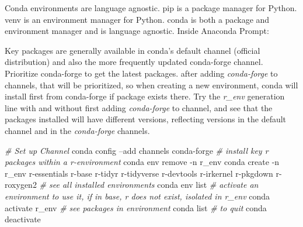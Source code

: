 \documentclass[
]{article}
\newenvironment{Shaded}{\begin{snugshade}}{\end{snugshade}}
\newcommand{\CommentTok}[1]{\textcolor[rgb]{0.56,0.35,0.01}{\textit{#1}}}
\newcommand{\ExtensionTok}[1]{#1}
\newcommand{\NormalTok}[1]{#1}
\begin{document}
Conda environments are language agnostic. pip is a package manager for
Python. venv is an environment manager for Python. conda is both a
package and environment manager and is language agnostic. Inside
Anaconda Prompt:

Key packages are generally available in conda's default channel
(official distribution) and also the more frequently updated conda-forge
channel. Prioritize conda-forge to get the latest packages. after adding
\emph{conda-forge} to channels, that will be prioritized, so when
creating a new environment, conda will install first from conda-forge if
package exists there. Try the \emph{r\_env} generation line with and
without first adding \emph{conda-forge} to channel, and see that the
packages installed will have different versions, reflecting versions in
the default channel and in the \emph{conda-forge} channels.

\begin{Shaded}
\begin{Highlighting}[]
\CommentTok{# Set up Channel}
\ExtensionTok{conda}\NormalTok{ config --add channels conda-forge}
\CommentTok{# install key r packages within a r-environment}
\ExtensionTok{conda}\NormalTok{ env remove -n r_env}
\ExtensionTok{conda}\NormalTok{ create -n r_env r-essentials r-base r-tidyr r-tidyverse r-devtools r-irkernel r-pkgdown r-roxygen2}
\CommentTok{# see all installed environments}
\ExtensionTok{conda}\NormalTok{ env list}
\CommentTok{# activate an environment to use it, if in base, r does not exist, isolated in r_env}
\ExtensionTok{conda}\NormalTok{ activate r_env}
\CommentTok{# see packages in environment}
\ExtensionTok{conda}\NormalTok{ list}
\CommentTok{# to quit}
\ExtensionTok{conda}\NormalTok{ deactivate}
\end{Highlighting}
\end{Shaded}
\end{document}
